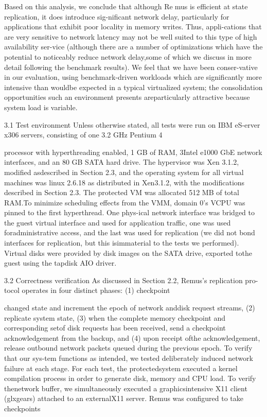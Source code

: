 Based on this analysis, we conclude that although Remus is efficient at state replication, it does introduce sig-nificant network delay, particularly for applications that
exhibit poor locality in memory writes. Thus, appli-cations that are very sensitive to network latency may
not be well suited to this type of high availability ser-vice (although there are a number of optimizations which
have the potential to noticeably reduce network delay,some of which we discuss in more detail following the
benchmark results). We feel that we have been conser-vative in our evaluation, using benchmark-driven workloads which are significantly more intensive than wouldbe expected in a typical virtualized system; the consolidation opportunities such an environment presents areparticularly attractive because system load is variable.

3.1 Test environment
Unless otherwise stated, all tests were run on IBM eS-erver x306 servers, consisting of one 3.2 GHz Pentium 4

processor with hyperthreading enabled, 1 GB of RAM, 3Intel e1000 GbE network interfaces, and an 80 GB SATA
hard drive. The hypervisor was Xen 3.1.2, modified asdescribed in Section 2.3, and the operating system for all
virtual machines was linux 2.6.18 as distributed in Xen3.1.2, with the modifications described in Section 2.3.
The protected VM was allocated 512 MB of total RAM.To minimize scheduling effects from the VMM, domain
0's VCPU was pinned to the first hyperthread. One phys-ical network interface was bridged to the guest virtual interface and used for application traffic, one was used foradministrative access, and the last was used for replication (we did not bond interfaces for replication, but this isimmaterial to the tests we performed). Virtual disks were
provided by disk images on the SATA drive, exported tothe guest using the tapdisk AIO driver.

3.2 Correctness verification
As discussed in Section 2.2, Remus's replication pro-tocol operates in four distinct phases: (1) checkpoint

changed state and increment the epoch of network anddisk request streams, (2) replicate system state, (3) when
the complete memory checkpoint and corresponding setof disk requests has been received, send a checkpoint acknowledgement from the backup, and (4) upon receipt ofthe acknowledgement, release outbound network packets
queued during the previous epoch. To verify that our sys-tem functions as intended, we tested deliberately induced
network failure at each stage. For each test, the protectedsystem executed a kernel compilation process in order
to generate disk, memory and CPU load. To verify thenetwork buffer, we simultaneously executed a graphicsintensive X11 client (glxgears) attached to an externalX11 server. Remus was configured to take checkpoints

